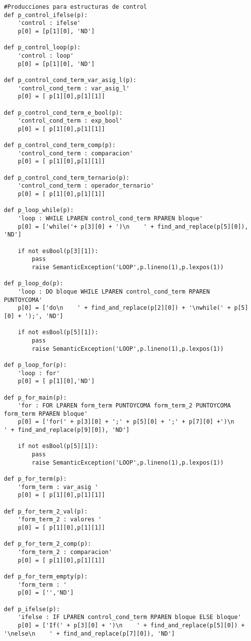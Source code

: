 \begin{verbatim}
#Producciones para estructuras de control
def p_control_ifelse(p):
    'control : ifelse'
    p[0] = [p[1][0], 'ND']

def p_control_loop(p):
    'control : loop'
    p[0] = [p[1][0], 'ND']

def p_control_cond_term_var_asig_l(p):
    'control_cond_term : var_asig_l'
    p[0] = [ p[1][0],p[1][1]]

def p_control_cond_term_e_bool(p):
    'control_cond_term : exp_bool'
    p[0] = [ p[1][0],p[1][1]]

def p_control_cond_term_comp(p):
    'control_cond_term : comparacion'
    p[0] = [ p[1][0],p[1][1]]

def p_control_cond_term_ternario(p):
    'control_cond_term : operador_ternario'
    p[0] = [ p[1][0],p[1][1]]

def p_loop_while(p):
    'loop : WHILE LPAREN control_cond_term RPAREN bloque'
    p[0] = ['while('+ p[3][0] + ')\n    ' + find_and_replace(p[5][0]), 'ND']

    if not esBool(p[3][1]):
        pass
        raise SemanticException('LOOP',p.lineno(1),p.lexpos(1))

def p_loop_do(p):
    'loop : DO bloque WHILE LPAREN control_cond_term RPAREN PUNTOYCOMA'
    p[0] = ['do\n    ' + find_and_replace(p[2][0]) + '\nwhile(' + p[5][0] + ');', 'ND']

    if not esBool(p[5][1]):
        pass
        raise SemanticException('LOOP',p.lineno(1),p.lexpos(1))

def p_loop_for(p):
    'loop : for'
    p[0] = [ p[1][0],'ND']

def p_for_main(p):
    'for : FOR LPAREN form_term PUNTOYCOMA form_term_2 PUNTOYCOMA form_term RPAREN bloque'
    p[0] = ['for(' + p[3][0] + ';' + p[5][0] + ';' + p[7][0] +')\n    ' + find_and_replace(p[9][0]), 'ND']

    if not esBool(p[5][1]):
        pass
        raise SemanticException('LOOP',p.lineno(1),p.lexpos(1))

def p_for_term(p):
    'form_term : var_asig '
    p[0] = [ p[1][0],p[1][1]]

def p_for_term_2_val(p):
    'form_term_2 : valores '
    p[0] = [ p[1][0],p[1][1]]

def p_for_term_2_comp(p):
    'form_term_2 : comparacion'
    p[0] = [ p[1][0],p[1][1]]

def p_for_term_empty(p):
    'form_term : '
    p[0] = ['','ND']

def p_ifelse(p):
    'ifelse : IF LPAREN control_cond_term RPAREN bloque ELSE bloque'
    p[0] = ['If(' + p[3][0] + ')\n    ' + find_and_replace(p[5][0]) + '\nelse\n    ' + find_and_replace(p[7][0]), 'ND']


\end{verbatim}
